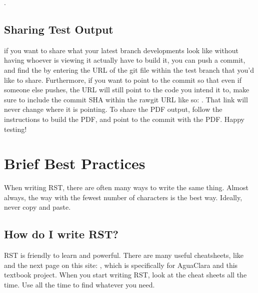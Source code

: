 \documentclass[letterpaper,10pt,english]{sphinxmanual}
\begin{document}
%
\begin{sphinxVerbatim}[commandchars=\\\{\}]
     
\end{sphinxVerbatim}

.


\subsection{Sharing Test Output}
\label{\detokenize{Textbook_Creation_Help/rst_intro:sharing-test-output}}
if you want to share what your latest branch developments look like without having whoever is viewing it actually have to build it, you can push a commit, and find the  by entering the URL of the git file within the test branch that you’d like to share. Furthermore, if you want to point to the commit so that even if someone else pushes, the URL will still point to the code you intend it to, make sure to include the commit SHA within the rawgit URL like so: . That link will never change where it is pointing. To share the PDF output, follow the {\hyperref[\detokenize{Textbook_Creation_Help/rst_intro:heading-testing-online}]{}} instructions to build the PDF, and point to the commit with the PDF. Happy testing!


\section{Brief Best Practices}
\label{\detokenize{Textbook_Creation_Help/rst_intro:brief-best-practices}}\label{\detokenize{Textbook_Creation_Help/rst_intro:heading-brief-best-practices}}
When writing RST, there are often many ways to write the same thing. Almost always, the way with the fewest number of characters is the best way. Ideally, never copy and paste.


\subsection{How do I write RST?}
\label{\detokenize{Textbook_Creation_Help/rst_intro:how-do-i-write-rst}}\label{\detokenize{Textbook_Creation_Help/rst_intro:heading-how-do-i-write-rst}}
RST is friendly to learn and powerful. There are many useful cheatsheets, like  and the next page on this site: , which is specifically for AguaClara and this textbook project. When you start writing RST, look at the cheat sheets all the time. Use  all the time to find whatever you need.
\end{document}
